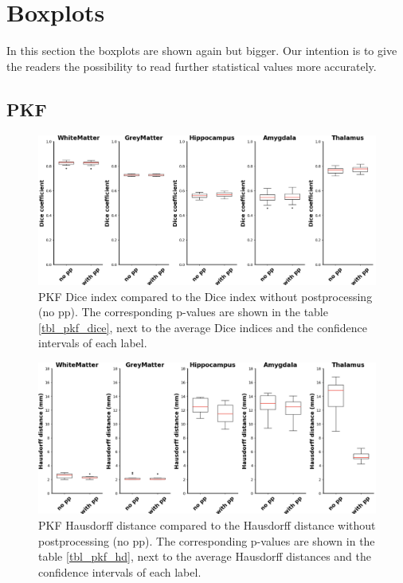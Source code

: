 \documentclass[journal]{IEEEtran}
\begin{document}
\section{Boxplots}
\label{sec_bb}
In this section the boxplots are shown again but bigger. Our intention is to give the readers the possibility to read further statistical values more accurately. 
\subsection{PKF}
\label{sec_bb_pfk}
\begin{figure}[h!]
\centering
\includegraphics[width=4.9in]{img/boxplots/PKF-Dice.png}
\caption{PKF Dice index compared to the Dice index without postprocessing (no pp). The corresponding p-values are shown in the table \ref{tbl_pkf_dice}, next to the average Dice indices and the confidence intervals of each label.}
\label{fig_pkf_dice_appendix}
\end{figure}

\begin{figure}[h!]
\centering

\includegraphics[width=4.9in]{img/boxplots/PKF-HD.png}
\caption{PKF Hausdorff distance compared to the Hausdorff distance without postprocessing (no pp). The corresponding p-values are shown in the table \ref{tbl_pkf_hd}, next to the average Hausdorff distances and the confidence intervals of each label.}
\label{fig_pkf-hd_appendix}
\end{figure}
\end{document}
